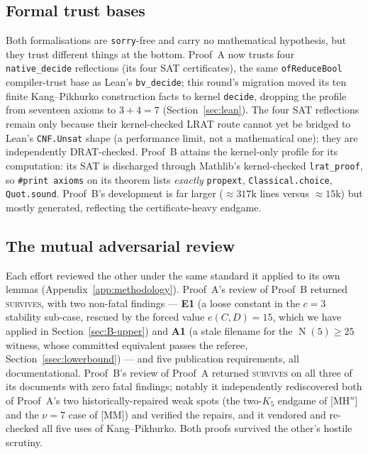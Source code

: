 \documentclass[11pt,reqno]{amsart}
\theoremstyle{definition}
\theoremstyle{remark}
\DeclareMathOperator{\Ncap}{N}
\begin{document}
\subsection{Formal trust bases}
Both formalisations are \texttt{sorry}-free and carry no mathematical hypothesis, but they
trust different things at the bottom. Proof~A now trusts four \texttt{native\_decide}
reflections (its four SAT certificates), the same \texttt{ofReduceBool} compiler-trust base
as Lean's \texttt{bv\_decide}; this round's migration moved its ten finite Kang--Pikhurko
construction facts to kernel \texttt{decide}, dropping the profile from seventeen axioms to
$3+4=7$ (Section~\ref{sec:lean}). The four SAT reflections remain only because their
kernel-checked LRAT route cannot yet be bridged to Lean's \texttt{CNF.Unsat} shape (a
performance limit, not a mathematical one); they are independently DRAT-checked. Proof~B
attains the kernel-only profile for its computation: its SAT is discharged through
Mathlib's kernel-checked \texttt{lrat\_proof}, so \texttt{\#print axioms} on its theorem
lists \emph{exactly} \texttt{propext}, \texttt{Classical.choice}, \texttt{Quot.sound}. Proof~B's development is far larger
($\approx\!317$k lines versus $\approx\!15$k) but mostly generated, reflecting the
certificate-heavy endgame.

\subsection{The mutual adversarial review}
Each effort reviewed the other under the same standard it applied to its own lemmas
(Appendix~\ref{app:methodology}). Proof~A's review of Proof~B returned \textsc{survives},
with two non-fatal findings --- \textbf{E1} (a loose constant in the $c=3$ stability
sub-case, rescued by the forced value $e(C,D)=15$, which we have applied in
Section~\ref{sec:B-upper}) and \textbf{A1} (a stale filename for the $\Ncap(5)\ge 25$
witness, whose committed equivalent passes the referee, Section~\ref{ssec:lowerbound}) ---
and five publication requirements, all documentational. Proof~B's review of Proof~A
returned \textsc{survives} on all three of its documents with zero fatal findings; notably
it independently rediscovered both of Proof~A's two historically-repaired weak spots (the
two-$K_5$ endgame of \textsf{[MH$''$]} and the $\nu=7$ case of \textsf{[MM]}) and verified
the repairs, and it vendored and re-checked all five uses of Kang--Pikhurko. Both proofs
survived the other's hostile scrutiny.
\end{document}
